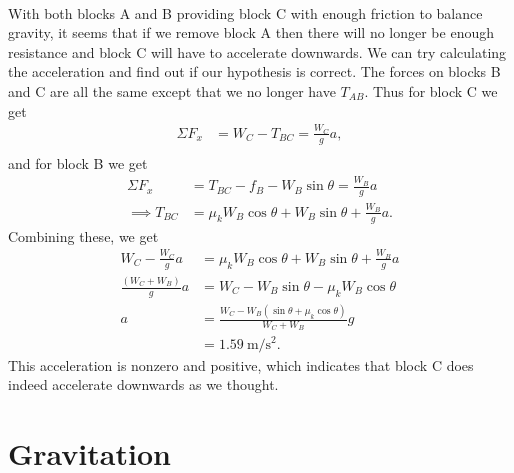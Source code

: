\documentclass[../classical_mechanics.tex]{subfiles}
\begin{document}
\begin{example}
            \paragraph{}
            With both blocks A and B providing block C with enough friction to balance gravity, it seems that if we remove block A then there will no longer be enough resistance and block C will have to accelerate downwards.
            We can try calculating the acceleration and find out if our hypothesis is correct.
            The forces on blocks B and C are all the same except that we no longer have $T_{AB}$.
            Thus for block C we get
            \begin{align}
                \Sigma F_x&=W_C-T_{BC}=\frac{W_C}{g}a,\\
            \end{align}
            and for block B we get
            \begin{align}
                \Sigma F_x&=T_{BC}-f_B-W_B\sin\theta=\frac{W_B}{g}a\\
                \implies T_{BC}&=\mu_k W_B\cos\theta+W_B\sin\theta+\frac{W_B}{g}a.
            \end{align}
            Combining these, we get
            \begin{align}
                W_C-\frac{W_C}{g}a&=\mu_k W_B\cos\theta+W_B\sin\theta+\frac{W_B}{g}a\\
                \frac{(W_C+W_B)}{g}a&=W_C-W_B\sin\theta-\mu_k W_B\cos\theta\\
                a&=\frac{W_C-W_B(\sin\theta+\mu_k\cos\theta)}{W_C+W_B}g\\
                &=\qty{1.59}{\metre\per\square\second}.
            \end{align}
            This acceleration is nonzero and positive, which indicates that block C does indeed accelerate downwards as we thought.
        \end{example}

    \section{Gravitation}\label{sec:gravitation}
\end{document}
